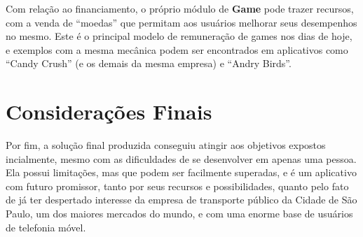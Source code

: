 Com relação ao financiamento, o próprio módulo de \textbf{Game} pode trazer recursos, com a venda de ``moedas'' que permitam aos usuários melhorar seus desempenhos no mesmo. Este é o principal modelo de remuneração de games nos dias de hoje, e exemplos com a mesma mecânica podem ser encontrados em aplicativos como ``Candy Crush'' (e os demais da mesma empresa) e ``Andry Birds''.

\section{Considerações Finais}
Por fim, a solução final produzida conseguiu atingir aos objetivos expostos incialmente, mesmo com as dificuldades de se desenvolver em apenas uma pessoa. Ela possui limitações, mas que podem ser facilmente superadas, e é um aplicativo com futuro promissor, tanto por seus recursos e possibilidades, quanto pelo fato de já ter despertado interesse da empresa de transporte público da Cidade de São Paulo, um dos maiores mercados do mundo, e com uma enorme base de usuários de telefonia móvel.

